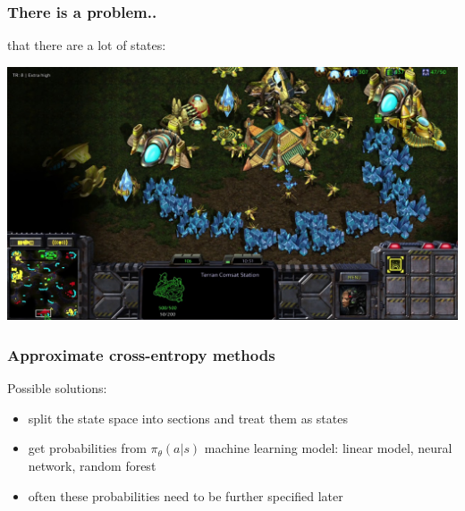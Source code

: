 \documentclass[fullscreen=true, bookmarks=true, hyperref={pdfencoding=unicode}]{beamer}
\begin{document}
\begin{frame}
  \frametitle{There is a problem..}

  \pause
  that there are a lot of states:
  \begin{center}
    \includegraphics[keepaspectratio,
                     width=.85\paperwidth]{starcraft3.jpg}
  \end{center}
\end{frame}


\begin{frame}
\frametitle{Approximate cross-entropy methods}

    Possible solutions:
    \begin{itemize}
      \item split the state space into sections and treat them as states
      \pause
      \item get probabilities from $\pi_\theta (a | s)$ machine learning model: linear model, neural network, random forest
      \pause
      \item often these probabilities need to be further specified later
    \end{itemize}
\end{frame}

\end{document}
